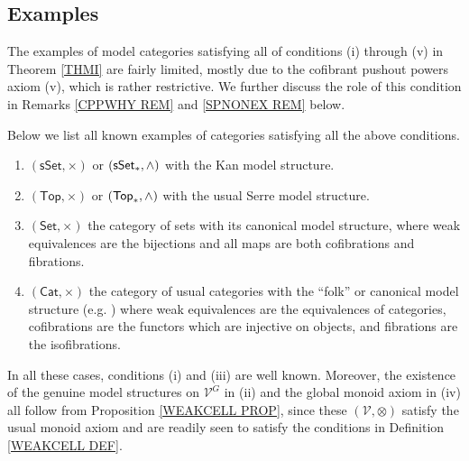 \documentclass[a4paper,10pt
,draft
]{article}%
\numberwithin{equation}{section}
\numberwithin{figure}{section}
\theoremstyle{definition} %
\newcommand{\Cat}{\mathsf{Cat}}
\newcommand{\F}{\ensuremath{\mathcal F}}
\newcommand{\V}{\ensuremath{\mathcal V}}
\newcommand{\1}{\ensuremath{\mathbbm 1}}%
\begin{document}





\subsection{Examples}



The examples of 
model categories satisfying 
all of conditions (i) through (v)
in Theorem \ref{THMI}
are fairly limited, 
mostly due to 
the cofibrant pushout powers axiom (v),
which is rather restrictive.
We further discuss the role of this condition 
in Remarks 
\ref{CPPWHY REM} and
\ref{SPNONEX REM} below.

Below we list all known examples of categories satisfying all the above conditions.
\begin{enumerate}[label = (\alph*)]
\item $(\mathsf{sSet},\times)$ or $(\mathsf{sSet}_{\**},\wedge)$
with the Kan model structure.
\item $(\mathsf{Top},\times)$ or $(\mathsf{Top}_{\**},\wedge)$
with the usual Serre model structure.
\item $(\mathsf{Set},\times)$ the category of sets with its canonical model structure,
where weak equivalences are the bijections and all maps are both cofibrations and fibrations.
\item $(\Cat,\times)$ the category of usual categories
with the ``folk'' or canonical model structure (e.g. \cite{Rez})
where weak equivalences are the equivalences of categories,
cofibrations are the functors which are injective on objects,
and fibrations are the isofibrations.
\end{enumerate}
In all these cases, conditions (i) and (iii) %
are well known.
Moreover,
the existence of the genuine model structures on $\V^G$ in (ii)
and the global monoid axiom in (iv)
all follow from Proposition \ref{WEAKCELL PROP},
since these $(\V,\otimes)$ satisfy the usual monoid axiom and
are readily seen to satisfy the conditions in Definition \ref{WEAKCELL DEF}.
\end{document}
